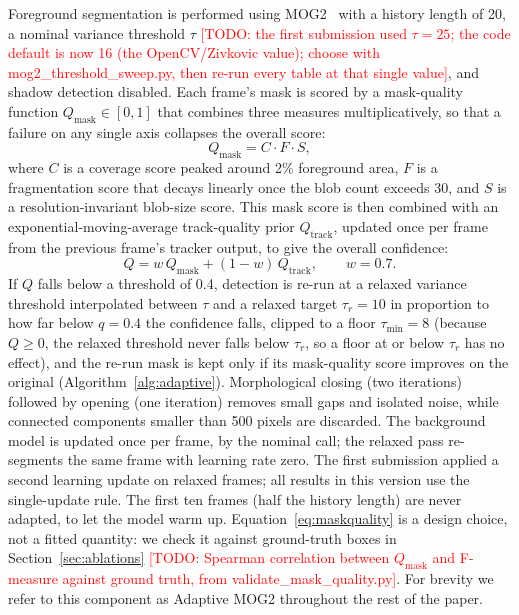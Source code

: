 \documentclass[runningheads]{llncs}
\newcommand{\todo}[1]{\textcolor{red}{[TODO: #1]}}
\begin{document}
Foreground segmentation is performed using MOG2~\cite{zivkovic2004improved,zivkovic2006efficient} 
with a history length of 20, a nominal variance threshold $\tau$ 
\todo{the first submission used $\tau=25$; the code default is now 16 (the OpenCV/Zivkovic value); choose with mog2\_threshold\_sweep.py, then re-run every table at that single value}, 
and shadow detection disabled. Each frame's mask is scored by a mask-quality function 
$Q_{\text{mask}} \in [0,1]$ that combines three measures multiplicatively, 
so that a failure on any single axis collapses the overall score:
\begin{equation}
Q_{\text{mask}} = C \cdot F \cdot S,
\label{eq:maskquality}
\end{equation}
where $C$ is a coverage score peaked around 2\% foreground area, $F$ is a 
fragmentation score that decays linearly once the blob count exceeds 30, 
and $S$ is a resolution-invariant blob-size score. This mask score is 
then combined with an exponential-moving-average track-quality prior 
$Q_{\text{track}}$, updated once per frame from the previous frame's 
tracker output, to give the overall confidence:
\begin{equation}
Q = w \, Q_{\text{mask}} + (1-w) \, Q_{\text{track}}, \qquad w = 0.7.
\label{eq:confidence}
\end{equation}
If $Q$ falls below a threshold of 0.4, detection is re-run at a relaxed 
variance threshold interpolated between $\tau$ and a relaxed target $\tau_r=10$ in 
proportion to how far below $q=0.4$ the confidence falls, clipped to a floor 
$\tau_{\min}=8$ (because $Q\ge 0$, the relaxed threshold never falls below $\tau_r$, so a floor 
at or below $\tau_r$ has no effect), and the re-run mask is kept only if its mask-quality score 
improves on the original (Algorithm~\ref{alg:adaptive}). Morphological 
closing (two iterations) followed by opening (one iteration) removes 
small gaps and isolated noise, while connected components smaller than 
500 pixels are discarded. The background model is updated once per frame, by the nominal 
call; the relaxed pass re-segments the same frame with learning rate zero. The first 
submission applied a second learning update on relaxed frames; all results in this version 
use the single-update rule. The first ten frames (half the history length) are never adapted, to let the model warm up. 
Equation~\ref{eq:maskquality} is a design choice, not a fitted quantity: we check it against 
ground-truth boxes in Section~\ref{sec:ablations} \todo{Spearman correlation between $Q_{\text{mask}}$ and 
F-measure against ground truth, from validate\_mask\_quality.py}. For brevity we refer to this component as 
Adaptive MOG2 throughout the rest of the paper.
\end{document}
